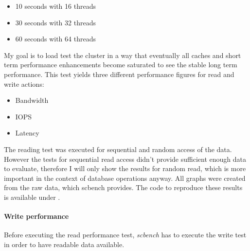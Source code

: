 \documentclass[titlepage, a4paper, 11pt]{scrartcl}
\begin{document}
            \begin{itemize}
                \item 10 seconds with 16 threads
                \item 30 seconds with 32 threads
                \item 60 seconds with 64 threads
            \end{itemize}

            My goal is to load test the cluster in a way that eventually all caches and short term performance enhancements become saturated to see the stable long term performance. This test yields three different performance figures for read and write actions:

            \begin{itemize}
                \item Bandwidth
                \item IOPS
                \item Latency
            \end{itemize}

            The reading test was executed for sequential and random access of the data. However the tests for sequential read access didn't provide sufficient enough data to evaluate, therefore I will only show the results for random read, which is more important in the context of database operations anyway.
            All graphs were created from the raw data, which scbench provides. The code to reproduce these results is available under \cite{ghceph}.

            \paragraph{Write performance}

                Before executing the read performance test, \textit{scbench} has to execute the write test in order to have readable data available.
\end{document}
